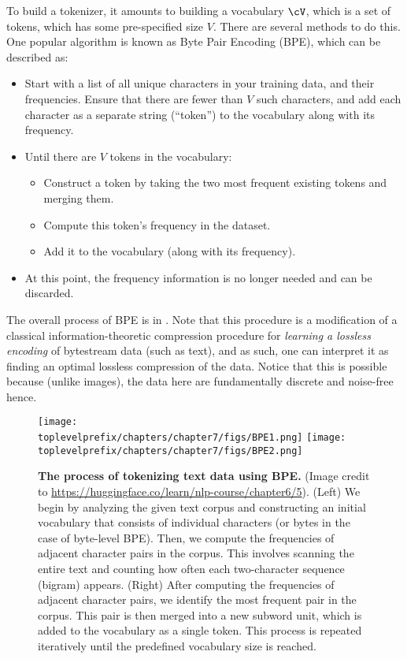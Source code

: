 \documentclass[\toplevelprefix/book-main.tex]{subfiles}
\begin{document}
To build a tokenizer, it amounts to building a vocabulary \(\cV\), which is a set of tokens, which has some pre-specified size \(V\). There are several methods to do this. One popular algorithm is known as Byte Pair Encoding (BPE), which can be described as:
\begin{itemize}
    \item Start with a list of all unique characters in your training data, and their frequencies. Ensure that there are fewer than \(V\) such characters, and add each character as a separate string (``token'') to the vocabulary along with its frequency.
    \item Until there are \(V\) tokens in the vocabulary:
    \begin{itemize}
        \item Construct a token by taking the two most frequent existing tokens and merging them.
        \item Compute this token's frequency in the dataset.
        \item Add it to the vocabulary (along with its frequency).
    \end{itemize} 
    \item At this point, the frequency information is no longer needed and can be discarded.
\end{itemize}
The overall process of BPE is in . Note that this procedure is a modification of a classical information-theoretic compression procedure for \textit{learning a lossless encoding} of bytestream data (such as text), and as such, one can interpret it as finding an optimal lossless compression of the data. Notice that this is possible because (unlike images), the data here are fundamentally discrete and noise-free hence.
\begin{figure}
    \centering
    \texttt{[image: \\toplevelprefix/chapters/chapter7/figs/BPE1.png]}\hspace{0.6in} 
    \texttt{[image: \\toplevelprefix/chapters/chapter7/figs/BPE2.png]} 
    \caption{\small {\bf The process of tokenizing text data using BPE.} (Image credit to \url{https://huggingface.co/learn/nlp-course/chapter6/5}). (Left) We begin by analyzing the given text corpus and constructing an initial vocabulary that consists of individual characters (or bytes in the case of byte-level BPE). Then, we compute the frequencies of adjacent character pairs in the corpus. This involves scanning the entire text and counting how often each two-character sequence (bigram) appears. (Right) After computing the frequencies of adjacent character pairs, we identify the most frequent pair in the corpus. This pair is then merged into a new subword unit, which is added to the vocabulary as a single token. This process is repeated iteratively until the predefined vocabulary size is reached. }
    \label{fig:BPE}
\end{figure}
\end{document}
